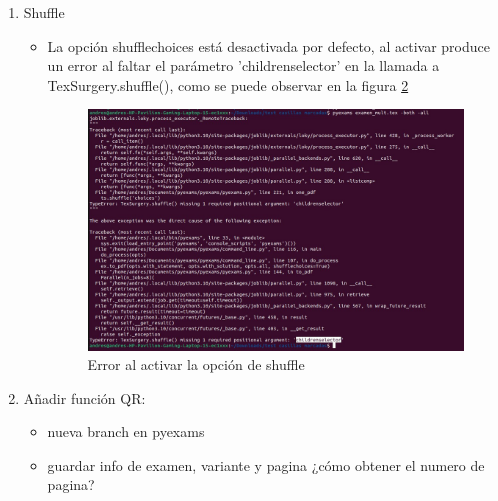 \begin{itemize}
\begin{enumerate}
\begin{itemize}
\begin{figure}
                \caption{Solucion generada mal: casillas correctas no aparecen}
                \label{fig:casillasSolMal}
            \end{figure}
            \item generar al menos una versión (usar shuffle para las casillas) \\
            2 versiones distintas con alumnos.csv \\
            ¿cómo activo el shuffle? *
            \item ¿distintas formas de rellenar casillas?
            \item rellenar las casillas de distintas formas y corregir
        \end{itemize}
        \item Shuffle
        \begin{itemize}
            \item La opción shufflechoices está desactivada por defecto, al activar produce un error al faltar el parámetro 'childrenselector' en la llamada a TexSurgery.shuffle(), como se puede observar en la figura \ref{fig:errorShufle}
            \begin{figure}
                \centering
                \includegraphics[width=\textwidth]{figures/error_shuffle.jpeg}
                \caption{Error al activar la opción de shuffle}
                \label{fig:errorShufle}
            \end{figure}
        \end{itemize}
        \item Añadir función QR:
        \begin{itemize}
            \item nueva branch en pyexams
            \item guardar info de examen, variante y pagina ¿cómo obtener el numero de pagina?

\end{itemize}
\end{enumerate}
\end{itemize}
